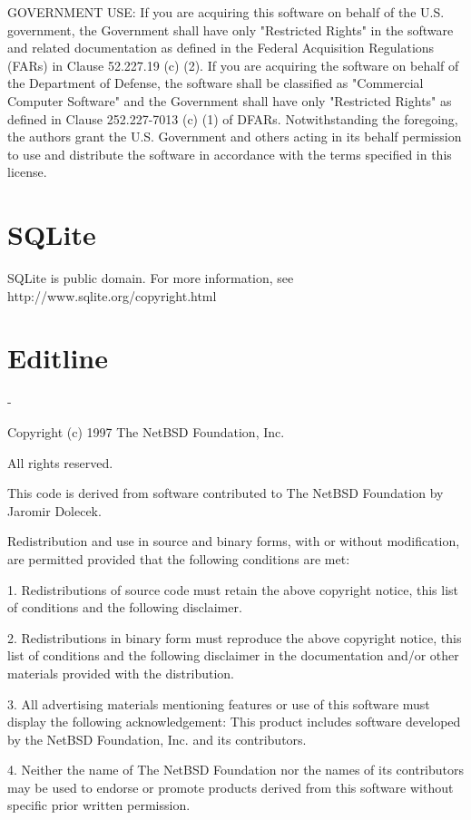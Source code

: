 \documentclass[twoside]{tceusermanual}
\begin{document}
GOVERNMENT USE: If you are acquiring this software on behalf of the U.S. government, the Government shall have only "Restricted Rights" in the software and related documentation as defined in the Federal Acquisition Regulations (FARs) in Clause 52.227.19 (c) (2). If you are acquiring the software on behalf of the Department of Defense, the software shall be classified as "Commercial Computer Software" and the Government shall have only "Restricted Rights" as defined in Clause 252.227-7013 (c) (1) of DFARs. Notwithstanding the foregoing, the authors grant the U.S. Government and others acting in its behalf permission to use and distribute the software in accordance with the terms specified in this license.

\section{SQLite}

SQLite is public domain. For more information, see http://www.sqlite.org/copyright.html

\section{Editline}

   -

   Copyright (c) 1997 The NetBSD Foundation, Inc.

   All rights reserved.
  
   This code is derived from software contributed to The NetBSD Foundation
   by Jaromir Dolecek.
  
   Redistribution and use in source and binary forms, with or without
   modification, are permitted provided that the following conditions
   are met:

   1. Redistributions of source code must retain the above copyright
      notice, this list of conditions and the following disclaimer.

   2. Redistributions in binary form must reproduce the above copyright
      notice, this list of conditions and the following disclaimer in the
      documentation and/or other materials provided with the distribution.

   3. All advertising materials mentioning features or use of this software
      must display the following acknowledgement:
        This product includes software developed by the NetBSD
        Foundation, Inc. and its contributors.

   4. Neither the name of The NetBSD Foundation nor the names of its
      contributors may be used to endorse or promote products derived
      from this software without specific prior written permission.
  
\end{document}
